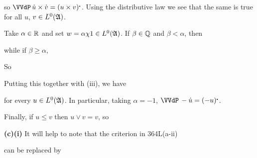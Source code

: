 {\noindent so $\VVdP\,\dot u\times\dot v=(u\times v)^{\centerdot}$.
Using the
distributive law we see that the same is true for all $u$,
$v\in L^0(\frak A)$.


 Take $\alpha\in\Bbb R$ and set
$w=\alpha\chi 1\in L^0(\frak A)$.   If $\beta\in\Bbb Q$ and $\beta<\alpha$,
then


\noindent while if $\beta\ge\alpha$,


\noindent So


\noindent Putting this together with (iii), we have


\noindent for every $u\in L^0(\frak A)$.   In particular, taking
$\alpha=-1$, $\VVdP\,-\dot u=(-u)^{\centerdot}$.

\medskip

 Finally, if $u\le v$ then $u\vee v=v$, so


\medskip

{\bf (c)(i)} It will help to note that the criterion in
364L(a-ii)


\noindent can be replaced by


}
